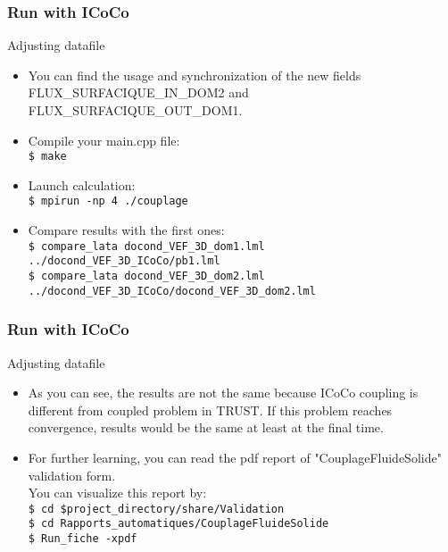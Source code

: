 \documentclass[10pt, hyperref={unicode=true,pdfusetitle, bookmarks=true,bookmarksnumbered=false,bookmarksopen=false, breaklinks=false,pdfborder={0 0 1},backref=true,colorlinks=true,linkcolor=darkblue,pageanchor, urlcolor=darkblue}]{beamer}
\begin{document}
\begin{frame}
\frametitle{Run with ICoCo}

\begin{block}{Adjusting datafile}
\begin{itemize}
\item You can find the usage and synchronization of the new fields FLUX\_SURFACIQUE\_IN\_DOM2 and FLUX\_SURFACIQUE\_OUT\_DOM1.

\item Compile your main.cpp file:\\
\texttt{\$ make}
\item Launch calculation:\\
\texttt{\$ mpirun -np 4 ./couplage}
\item Compare results with the first ones:\\
\texttt{\$ compare\_lata docond\_VEF\_3D\_dom1.lml ../docond\_VEF\_3D\_ICoCo/pb1.lml }\\
\texttt{\$ compare\_lata docond\_VEF\_3D\_dom2.lml ../docond\_VEF\_3D\_ICoCo/docond\_VEF\_3D\_dom2.lml }\\
\end{itemize}
\end{block}

\end{frame}

\begin{frame}
\frametitle{Run with ICoCo}

\begin{block}{Adjusting datafile}
\begin{itemize}
\item As you can see, the results are not the same because ICoCo coupling is different from coupled problem in TRUST. If this problem reaches convergence, results would be the same at least at the final time.\\
\item For further learning, you can read the pdf report of "CouplageFluideSolide" validation form.\\
You can visualize this report by:\\
\texttt{\$ cd \$project\_directory/share/Validation} \\
\texttt{\$ cd Rapports\_automatiques/CouplageFluideSolide } \\
\texttt{\$ Run\_fiche -xpdf }

\end{itemize}
\end{block}

\end{frame}
\end{document}
